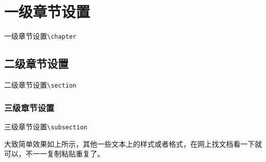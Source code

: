 \chapter{一级章节设置}
一级章节设置\verb|\chapter|
	\section{二级章节设置}
	二级章节设置\verb|\section|
		\subsection{三级章节设置}
		三级章节设置\verb|\subsection|
		
大致简单效果如上所示，其他一些文本上的样式或者格式，在网上找文档看一下就可以，不一一复制粘贴重复了。